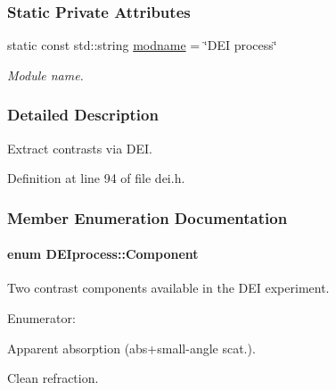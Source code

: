 \subsubsection*{Static Private Attributes}
\begin{DoxyCompactItemize}
\item 
static const std::string \hyperlink{group__deiedei_ga4d52136a225c01de8f1892b762bf2024}{modname} = \char`\"{}DEI process\char`\"{}
\begin{DoxyCompactList}\small\item\em Module name. \item\end{DoxyCompactList}\end{DoxyCompactItemize}


\subsubsection{Detailed Description}
Extract contrasts via DEI. 

Definition at line 94 of file dei.h.



\subsubsection{Member Enumeration Documentation}
\hypertarget{classDEIprocess_a3a41867d8f9d10e77541ae8484256cd2}{
\paragraph[{Component}]{\setlength{\rightskip}{0pt plus 5cm}enum {\bf DEIprocess::Component}}\hfill}
\label{classDEIprocess_a3a41867d8f9d10e77541ae8484256cd2}


Two contrast components available in the DEI experiment. 

\begin{Desc}
\item[Enumerator: ]\par
\begin{description}
\item[{\em 
\hypertarget{classDEIprocess_a3a41867d8f9d10e77541ae8484256cd2a2660890e65c78cc5d8591eee478139b7}{
ABS}
\label{classDEIprocess_a3a41867d8f9d10e77541ae8484256cd2a2660890e65c78cc5d8591eee478139b7}
}]Apparent absorption (abs+small-\/angle scat.). \item[{\em 
\hypertarget{classDEIprocess_a3a41867d8f9d10e77541ae8484256cd2a0a2d550a1d62db99452cf74ffc29416e}{
REF}
\label{classDEIprocess_a3a41867d8f9d10e77541ae8484256cd2a0a2d550a1d62db99452cf74ffc29416e}
}]Clean refraction. \end{description}
\end{Desc}



